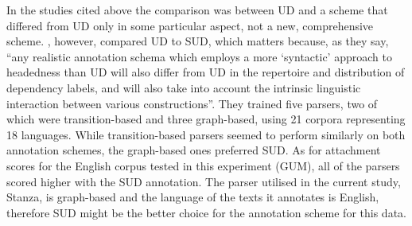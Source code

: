 In the studies cited above the comparison was between UD and a scheme that differed from UD only in some particular aspect, not a new, comprehensive scheme. \cite{tuo:prz:lac:21}, however, compared UD to SUD, which matters because, as they say, ``any realistic annotation schema which employs a more ‘syntactic’ approach to headedness than UD will also differ from UD in the repertoire and distribution of dependency labels, and will also take into account the intrinsic linguistic interaction between various constructions''. They trained five parsers, two of which were transition-based and three graph-based, using 21 corpora representing 18 languages. While transition-based parsers seemed to perform similarly on both annotation schemes, the graph-based ones preferred SUD. As for attachment scores for the English corpus tested in this experiment (GUM), all of the parsers scored higher with the SUD annotation. The parser utilised in the current study, Stanza, is graph-based and the language of the texts it annotates is English, therefore SUD might be the better choice for the annotation scheme for this data. 

